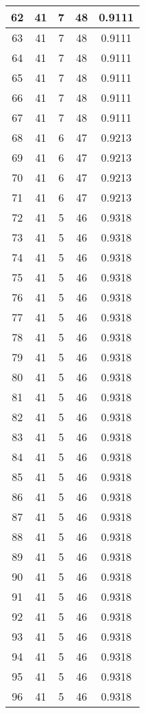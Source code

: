 \documentclass[letterpaper, 12pt]{article}
\begin{document}
\begin{longtable}{|c|c|c|c|c|}
\hline
62 & 41 & 7 & 48 & 0.9111 \\
\hline
63 & 41 & 7 & 48 & 0.9111 \\
\hline
64 & 41 & 7 & 48 & 0.9111 \\
\hline
65 & 41 & 7 & 48 & 0.9111 \\
\hline
66 & 41 & 7 & 48 & 0.9111 \\
\hline
67 & 41 & 7 & 48 & 0.9111 \\
\hline
68 & 41 & 6 & 47 & 0.9213 \\
\hline
69 & 41 & 6 & 47 & 0.9213 \\
\hline
70 & 41 & 6 & 47 & 0.9213 \\
\hline
71 & 41 & 6 & 47 & 0.9213 \\
\hline
72 & 41 & 5 & 46 & 0.9318 \\
\hline
73 & 41 & 5 & 46 & 0.9318 \\
\hline
74 & 41 & 5 & 46 & 0.9318 \\
\hline
75 & 41 & 5 & 46 & 0.9318 \\
\hline
76 & 41 & 5 & 46 & 0.9318 \\
\hline
77 & 41 & 5 & 46 & 0.9318 \\
\hline
78 & 41 & 5 & 46 & 0.9318 \\
\hline
79 & 41 & 5 & 46 & 0.9318 \\
\hline
80 & 41 & 5 & 46 & 0.9318 \\
\hline
81 & 41 & 5 & 46 & 0.9318 \\
\hline
82 & 41 & 5 & 46 & 0.9318 \\
\hline
83 & 41 & 5 & 46 & 0.9318 \\
\hline
84 & 41 & 5 & 46 & 0.9318 \\
\hline
85 & 41 & 5 & 46 & 0.9318 \\
\hline
86 & 41 & 5 & 46 & 0.9318 \\
\hline
87 & 41 & 5 & 46 & 0.9318 \\
\hline
88 & 41 & 5 & 46 & 0.9318 \\
\hline
89 & 41 & 5 & 46 & 0.9318 \\
\hline
90 & 41 & 5 & 46 & 0.9318 \\
\hline
91 & 41 & 5 & 46 & 0.9318 \\
\hline
92 & 41 & 5 & 46 & 0.9318 \\
\hline
93 & 41 & 5 & 46 & 0.9318 \\
\hline
94 & 41 & 5 & 46 & 0.9318 \\
\hline
95 & 41 & 5 & 46 & 0.9318 \\
\hline
96 & 41 & 5 & 46 & 0.9318 \\

\end{longtable}
\end{document}
